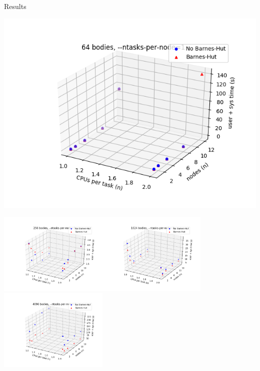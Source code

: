 \documentclass{beamer}
\begin{document}
\begin{frame}[allowframebreaks]{Results}
\framebreak

\includegraphics[width=\linewidth]{64-cpusPerTask-nodes-just_1_tpn}

\framebreak

\includegraphics[width=5.2cm]{256-cpusPerTask-nodes-just_1_tpn}\includegraphics[width=5.2cm]{1024-cpusPerTask-nodes-just_1_tpn}\includegraphics[width=5.2cm]{4096-cpusPerTask-nodes-just_1_tpn}


\end{frame}
\end{document}
